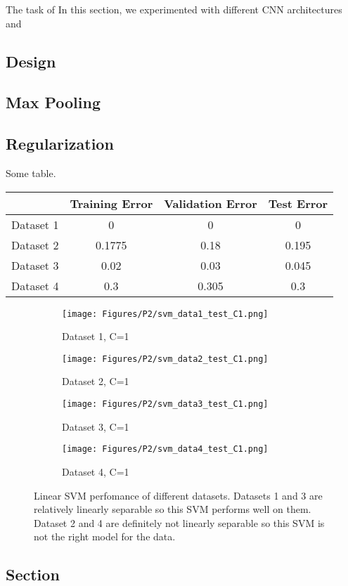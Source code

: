\documentclass[10pt,twoside]{article}
\begin{document}
\noindent The task of In this section, we experimented with different CNN architectures and 

\subsection{Design}

\noindent 

\subsection{Max Pooling}

\subsection{Regularization}

Some table. 
\begin{center}
 \begin{tabular}{||c c c c||} 
 \hline
  & Training Error & Validation Error & Test Error \\ [0.5ex] 
 \hline\hline
 Dataset 1 & 0 & 0 & 0 \\ 
 \hline
 Dataset 2 & 0.1775 & 0.18 & 0.195 \\
 \hline
 Dataset 3 & 0.02 & 0.03 & 0.045 \\
 \hline
 Dataset 4 & 0.3 & 0.305 & 0.3 \\
 \hline
\end{tabular}
\end{center}

\begin{figure}[h]
        \begin{subfigure}[b]{0.25\textwidth}
                \centering
                \texttt{[image: Figures/P2/svm\_data1\_test\_C1.png]}
                \caption{Dataset 1, C=1}
        \end{subfigure}%
        \begin{subfigure}[b]{0.25\textwidth}
                \centering
                \texttt{[image: Figures/P2/svm\_data2\_test\_C1.png]}
                \caption{Dataset 2, C=1}
        \end{subfigure}%
        \begin{subfigure}[b]{0.25\textwidth}
                \centering
                \texttt{[image: Figures/P2/svm\_data3\_test\_C1.png]}
                \caption{Dataset 3, C=1}
        \end{subfigure}%
        \begin{subfigure}[b]{0.25\textwidth}
                \centering
                \texttt{[image: Figures/P2/svm\_data4\_test\_C1.png]}
                \caption{Dataset 4, C=1}
        \end{subfigure}
        \caption{Linear SVM perfomance of different datasets. Datasets 1 and 3 are relatively linearly separable so this SVM performs well on them. Dataset 2 and 4 are definitely not linearly separable so this SVM is not the right model for the data.}\label{fig:animals}
\end{figure}

\subsection{Section}


\vfill
\end{document}
